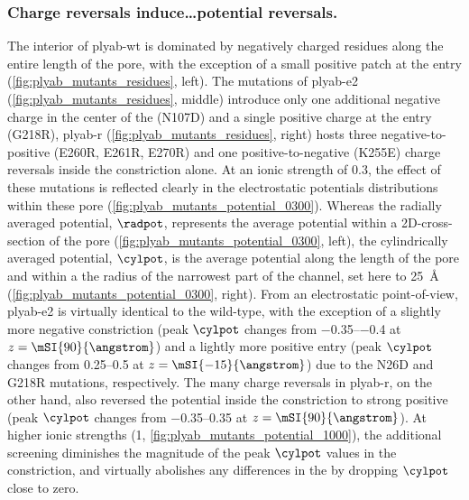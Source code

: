\subsubsection{Charge reversals induce\ldots potential reversals.}
%

The interior of \gls{plyab-wt} is dominated by negatively charged residues along the entire length of the
pore, with the exception of a small positive patch at the \transi{} entry (\cref{fig:plyab_mutants_residues},
left). The mutations of \gls{plyab-e2} (\cref{fig:plyab_mutants_residues}, middle) introduce only one
additional negative charge in the center of the \transi{} \lumen{} (N107D) and a single positive charge at the
\transi{} entry (G218R), \gls{plyab-r} (\cref{fig:plyab_mutants_residues}, right) hosts three
negative-to-positive (E260R, E261R, E270R) and one positive-to-negative (K255E) charge reversals inside the
\cisi{} constriction alone. At an ionic strength of \SI{0.3}{\Molar}, the effect of these mutations is
reflected clearly in the electrostatic potentials distributions within these pore
(\cref{fig:plyab_mutants_potential_0300}). Whereas the radially averaged potential, $\radpot$, represents the
average potential within a 2D-cross-section of the pore (\cref{fig:plyab_mutants_potential_0300}, left), the
cylindrically averaged potential, $\cylpot$, is the average potential along the length of the pore and within
a the radius of the narrowest part of the channel, set here to \SI{25}{\angstrom}
(\cref{fig:plyab_mutants_potential_0300}, right). From an electrostatic point-of-view, \gls{plyab-e2} is
virtually identical to the wild-type, with the exception of a slightly more negative constriction (peak
$\cylpot$ changes from \SIrange{-0.35}{-0.4}{\kTe} at $z = \mSI{90}{\angstrom}$) and a lightly more positive
\transi{} entry (peak $\cylpot$ changes from \SIrange{+0.25}{+0.5}{\kTe} at $z = \mSI{-15}{\angstrom}$) due to
the N26D and G218R mutations, respectively. The many charge reversals in \gls{plyab-r}, on the other hand,
also reversed the potential inside the constriction to strong positive (peak $\cylpot$ changes from
\SIrange{-0.35}{+0.35}{\kTe} at $z = \mSI{90}{\angstrom}$). At higher ionic strengths (\SI{1}{\Molar},
\cref{fig:plyab_mutants_potential_1000}), the additional screening diminishes the magnitude of the peak
$\cylpot$ values in the constriction, and virtually abolishes any differences in the \transi{} \lumen{} by
dropping $\cylpot$ close to zero.


